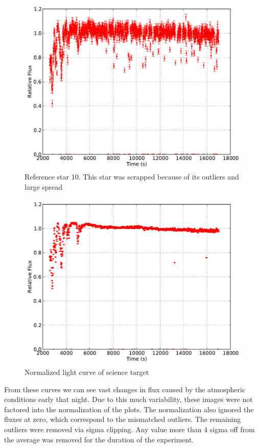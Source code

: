\documentclass{aastex61}
\begin{document}
\begin{figure}[h]
	\centering
	\includegraphics[scale = .45]{exo_curves10.pdf}
	\caption{Reference star 10. This star was scrapped because of its outliers and large spread}
	\label{fig: refcurve10}
\end{figure}
\begin{figure}[h]
	\centering
	\includegraphics[scale = .45]{exo_curves11.pdf}
	\caption{Normalized light curve of science target}
	\label{fig: scicurve1}
\end{figure}

From these curves we can see vast changes in flux caused by the atmospheric conditions early that night. Due to this much variability, these images were not factored into the normalization of the plots. The normalization also ignored the fluxes at zero, which correspond to the mismatched outliers. The remaining outliers were removed via sigma clipping. Any value more than 4 sigma off from the average was removed for the duration of the experiment.
\end{document}
